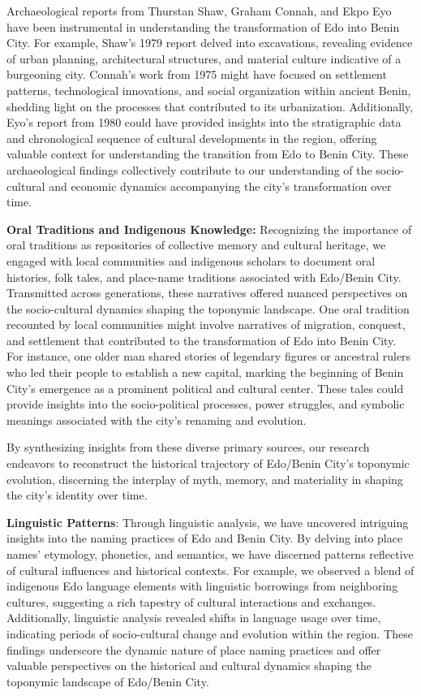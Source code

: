 Archaeological reports from Thurstan Shaw, Graham Connah, and Ekpo Eyo have been instrumental in understanding the transformation of Edo into Benin City. For example, Shaw's 1979 report delved into excavations, revealing evidence of urban planning, architectural structures, and material culture indicative of a burgeoning city. Connah's work from 1975 might have focused on settlement patterns, technological innovations, and social organization within ancient Benin, shedding light on the processes that contributed to its urbanization. Additionally, Eyo's report from 1980 could have provided insights into the stratigraphic data and chronological sequence of cultural developments in the region, offering valuable context for understanding the transition from Edo to Benin City. These archaeological findings collectively contribute to our understanding of the socio-cultural and economic dynamics accompanying the city's transformation over time.

\textbf{Oral Traditions and Indigenous Knowledge:} Recognizing the importance of oral traditions as repositories of collective memory and cultural heritage, we engaged with local communities and indigenous scholars to document oral histories, folk tales, and place-name traditions associated with Edo/Benin City. Transmitted across generations, these narratives offered nuanced perspectives on the socio-cultural dynamics shaping the toponymic landscape. One oral tradition recounted by local communities might involve narratives of migration, conquest, and settlement that contributed to the transformation of Edo into Benin City. For instance, one older man shared stories of legendary figures or ancestral rulers who led their people to establish a new capital, marking the beginning of Benin City's emergence as a prominent political and cultural center. These tales could provide insights into the socio-political processes, power struggles, and symbolic meanings associated with the city's renaming and evolution.

By synthesizing insights from these diverse primary sources, our research endeavors to reconstruct the historical trajectory of Edo/Benin City's toponymic evolution, discerning the interplay of myth, memory, and materiality in shaping the city's identity over time.

\textbf{Linguistic Patterns}:
Through linguistic analysis, we have uncovered intriguing insights into the naming practices of Edo and Benin City. By delving into place names' etymology, phonetics, and semantics, we have discerned patterns reflective of cultural influences and historical contexts. For example, we observed a blend of indigenous Edo language elements with linguistic borrowings from neighboring cultures, suggesting a rich tapestry of cultural interactions and exchanges. Additionally, linguistic analysis revealed shifts in language usage over time, indicating periods of socio-cultural change and evolution within the region. These findings underscore the dynamic nature of place naming practices and offer valuable perspectives on the historical and cultural dynamics shaping the toponymic landscape of Edo/Benin City.

